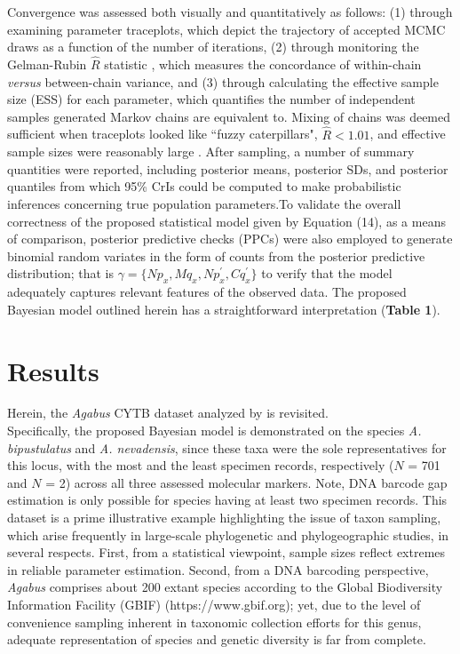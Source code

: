 \documentclass[12pt]{article}
\begin{document}
Convergence was assessed both visually and quantitatively as follows: (1) through \\ examining parameter traceplots, which depict the trajectory of accepted MCMC draws as a function of the number of iterations, (2) through monitoring the Gelman-Rubin $\hat{R}$ statistic \citep{gelman1992iterative, vehtari2017rank}, which measures the concordance of within-chain \textit{versus} between-chain variance, and (3) through calculating the effective sample size (ESS) for each parameter, which quantifies the number of independent samples generated Markov chains are equivalent to. Mixing of chains was deemed sufficient when traceplots looked like ``fuzzy caterpillars", $\hat{R} < 1.01$, and effective sample sizes were reasonably large \citep{gelman2020bayesian}.
After sampling, a number of summary quantities were reported, including posterior means, posterior SDs, and posterior quantiles from which 95\% CrIs could be computed to make probabilistic inferences concerning true population parameters.To validate the overall correctness of the proposed statistical model given by Equation (14), as a means of comparison, posterior predictive checks (PPCs) were also employed to generate binomial random variates in the form of counts from the posterior predictive distribution; that is $\gamma = \{Np_x, Mq_x, Np^{'}_x, Cq^{'}_x\}$ to verify that the model adequately captures relevant features of the observed data. The proposed Bayesian model outlined herein has a straightforward interpretation (\textbf{Table 1}). 

\section{Results}

Herein, the \textit{Agabus} CYTB dataset analyzed by \citet{phillips2024measure} is revisited. \\ Specifically, the proposed Bayesian model is demonstrated on the species \textit{A. bipustulatus} and \textit{A. nevadensis}, since these taxa were the sole representatives for this locus, with the most and the least specimen records, respectively ($N$ = 701 and $N$ = 2) across all three assessed molecular markers. Note, DNA barcode gap estimation is only possible for species having at least two specimen records. This dataset is a prime illustrative example highlighting the issue of taxon sampling, which arise frequently in large-scale phylogenetic and phylogeographic studies, in several respects. First, from a statistical viewpoint, sample sizes reflect extremes in reliable parameter estimation. Second, from a DNA barcoding perspective, \textit{Agabus} comprises about 200 extant species according to the Global Biodiversity Information Facility (GBIF) (https://www.gbif.org); yet, due to the level of convenience sampling inherent in taxonomic collection efforts for this genus, adequate representation of species and genetic diversity is far from complete. 
\end{document}
